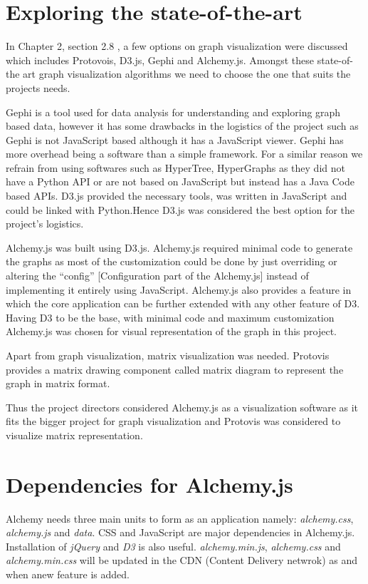 \section{Exploring the state-of-the-art}
\par In Chapter 2, section 2.8 , a few options on graph visualization were discussed which includes Protovois, D3.js, Gephi and Alchemy.js. Amongst these state-of-the art graph visualization algorithms we need to choose the one that suits the projects needs. 
\par  Gephi is a tool
used for data analysis for understanding and exploring graph based data, however it has some
drawbacks in the logistics of the project such as Gephi is not JavaScript based although it has a JavaScript viewer. Gephi has more overhead being a software than a simple framework. For a similar reason we refrain from using softwares such as HyperTree, HyperGraphs as they did not have a Python API or are not based on JavaScript but instead has a
Java Code based APIs.  D3.js
provided the necessary tools, was written in JavaScript and could be linked with Python.Hence D3.js was considered the best
option for the project's logistics.
\par Alchemy.js was built using D3.js. Alchemy.js required minimal code
to generate the graphs as most of the customization could be done by just overriding or altering the
“config” [Configuration part of the Alchemy.js] instead of implementing it entirely using
JavaScript. Alchemy.js also provides a feature in which the core application can be further extended
with any other feature of D3. Having D3 to be the base, with minimal code and maximum
customization Alchemy.js was chosen for visual representation of the graph in this project. \par Apart from graph visualization, matrix visualization was needed. Protovis provides a matrix drawing component called matrix diagram to represent the graph in matrix format.

\par Thus the project directors considered Alchemy.js as a visualization software as it fits the bigger project for graph visualization and Protovis  was considered to visualize matrix representation. 

\section{Dependencies for Alchemy.js}
Alchemy needs three main units to  form as an application namely:  \textit{alchemy.css}, \textit{alchemy.js} and \textit{data}. CSS and JavaScript are major dependencies in Alchemy.js. Installation of \textit{jQuery} and \textit{D3} is also useful. \textit{alchemy.min.js}, \textit{alchemy.css} and \textit{alchemy.min.css } will be updated in the CDN (Content Delivery netwrok) as and when anew feature is added.
